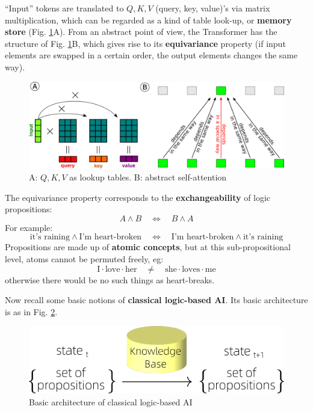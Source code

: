 \documentclass[runningheads]{llncs}
\newcommand{\circled}[1]{{\textcircled{\sffamily \scriptsize{#1}}}}
\begin{document}
``Input'' tokens are translated to $Q,K,V$ (query, key, value)'s via matrix multiplication, which can be regarded as a kind of table look-up, or \textbf{memory store} (Fig. \ref{Abstract-Self-Attention}\circled{A}).  From an abstract point of view, the Transformer has the structure of Fig. \ref{Abstract-Self-Attention}\circled{B}, which gives rise to its \textbf{equivariance} property (if input elements are swapped in a certain order, the output elements changes the same way).
\begin{figure}[H]
	\includegraphics[scale=0.55]{Abstract-Self-Attention.png}
	\caption{\circled{A}: $Q,K,V$ as lookup tables. \circled{B}: abstract self-attention}
	\label{Abstract-Self-Attention}
\end{figure}

The equivariance property corresponds to the \textbf{exchangeability} of logic propositions:
\begin{equation}
A \wedge B \quad \Leftrightarrow \quad B \wedge A
\end{equation}
For example:
\begin{equation}
\mbox{it's raining} \wedge \mbox{I'm heart-broken} \quad \Leftrightarrow \quad \mbox{I'm heart-broken} \wedge \mbox{it's raining}
\end{equation}
Propositions are made up of \textbf{atomic concepts}, but at this sub-propositional level, atoms cannot be permuted freely, eg:
\begin{equation}
\mbox{I} \cdot \mbox{love} \cdot \mbox{her} \quad \neq \quad \mbox{she} \cdot \mbox{loves} \cdot \mbox{me}
\end{equation}
otherwise there would be no such things as heart-breaks.

Now recall some basic notions of \textbf{classical logic-based AI}.  Its basic architecture is as in Fig. \ref{LBAI}.
\begin{figure}[H]
	\centering
	\includegraphics[scale=0.6]{LBAI.png}
	\caption{Basic architecture of classical logic-based AI}
	\label{LBAI}
\end{figure}
\end{document}

